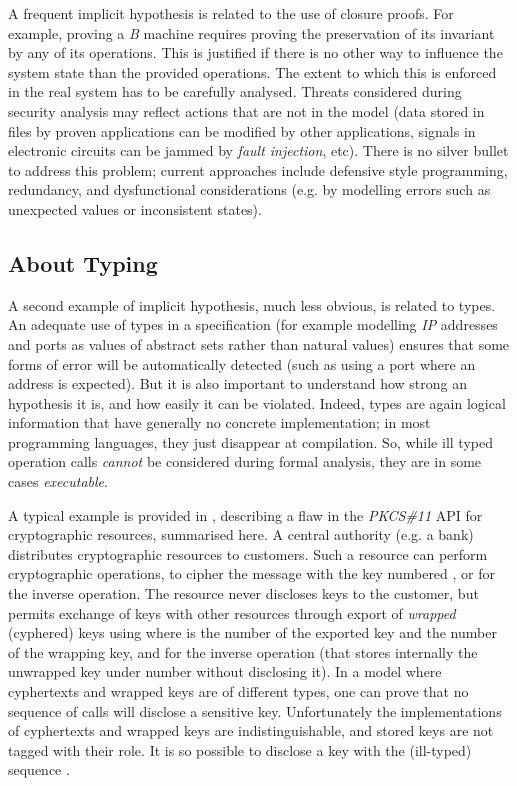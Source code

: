 \documentclass[conference]{IEEEtran}
\begin{document}
A frequent implicit hypothesis is related to the use of closure proofs. For example, proving a
\emph{B} machine requires proving the preservation of its invariant by any of its operations.
This is justified if there is no other way to influence the system state than the provided
operations. The extent to which this is enforced in the real system has to be carefully
analysed. Threats considered during security analysis may reflect actions that are not in the
model (data stored in files by proven applications can be modified by other applications,
signals in electronic circuits can be jammed by \emph{fault injection}, etc). There is no
silver bullet to address this problem; current approaches include defensive style programming,
redundancy, and dysfunctional considerations (e.g. by modelling errors such as unexpected
values or inconsistent states).

\subsection{About Typing}\label{typing}

A second example of implicit hypothesis, much less obvious, is related to types. An adequate
use of types in a specification (for example modelling \emph{IP} addresses and ports as
values of abstract sets rather than natural values) ensures that some forms of error will be
automatically detected (such as using a port where an address is expected). But it is also
important to understand how strong an hypothesis it is, and how easily it can be violated.
Indeed, types are again logical information that have generally no concrete implementation; in
most programming languages, they just disappear at compilation. So, while ill typed operation
calls \emph{cannot} be considered during formal analysis, they are in some cases
\emph{executable}.

A typical example is provided in \cite{DBLP:conf/ches/Clulow03}, describing a flaw in the
\emph{PKCS\#11} API for cryptographic resources, summarised here. A central authority (e.g. a
bank) distributes cryptographic resources to customers. Such a resource can perform
cryptographic operations, {\small} to cipher the message
{\small} with the key numbered {\small}, or {\small} for
the inverse operation. The resource never discloses keys to the customer, but permits exchange
of keys with other resources through export of \emph{wrapped} (cyphered) keys using
{\small} where {\small} is the number of the exported key and
{\small} the number of the wrapping key, and {\small} for the inverse
operation (that stores internally the unwrapped key under number {\small} without
disclosing it). In a model where cyphertexts and wrapped keys are of different types, one can
prove that no sequence of calls will disclose a sensitive key. Unfortunately the
implementations of cyphertexts and wrapped keys are indistinguishable, and stored keys are not
tagged with their role. It is so possible to disclose a key {\small} with the (ill-typed)
sequence {\small}.
\end{document}
